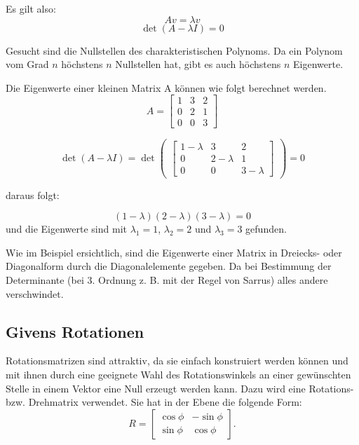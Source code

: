Es gilt also:
\begin{equation}
	Av=\lambda v
\end{equation}
\begin{equation}
	\det(A-\lambda I) = 0
\end{equation}

Gesucht sind die Nullstellen des charakteristischen Polynoms. Da ein Polynom vom Grad $n$ höchstens $n$ Nullstellen hat, gibt es auch höchstens $n$ Eigenwerte.

\begin{beispiel}
	Die Eigenwerte einer kleinen Matrix A können wie folgt berechnet werden.
	\begin{equation}
	A =
	\begin{bmatrix}
	1 & 3 & 2 \\
	0 & 2 & 1 \\
	0 & 0 & 3
	\end{bmatrix}
	\end{equation}
	
	\begin{equation}
	\det(A-\lambda I)= \det
	\begin{pmatrix}
	\begin{bmatrix}
	1-\lambda & 3 & 2 \\
	0 & 2-\lambda & 1 \\
	0 & 0 & 3-\lambda
	\end{bmatrix}
	\end{pmatrix}
	= 0
	\end{equation}
	
	daraus folgt:
	
	\begin{equation} (1-\lambda)(2-\lambda)(3-\lambda)=0\end{equation}
	und die Eigenwerte sind mit $\lambda_{1}=1$, $\lambda_{2}=2$ und $\lambda_{3}=3$ gefunden.
\end{beispiel}

Wie im Beispiel ersichtlich, sind die Eigenwerte einer Matrix in Dreiecks- oder Diagonalform durch die Diagonalelemente gegeben.
Da bei Bestimmung der Determinante (bei 3. Ordnung z. B. mit der Regel von Sarrus) alles andere verschwindet.

\subsection{Givens Rotationen\label{francis:section:grundlagen:givens}}
Rotationsmatrizen sind attraktiv, da sie einfach konstruiert werden können und mit ihnen durch eine geeignete Wahl des Rotationswinkels an einer gewünschten Stelle in einem Vektor eine Null erzeugt werden kann.
Dazu wird eine Rotations- bzw. Drehmatrix verwendet.
Sie hat in der Ebene die folgende Form:
\begin{equation}
	R=\begin{bmatrix}
	\cos\phi & -\sin\phi \\
	\sin\phi & \cos\phi
	\end{bmatrix}.
\end{equation}

